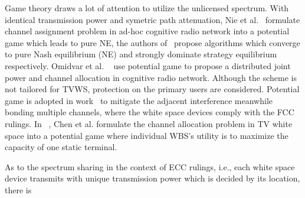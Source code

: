 \documentclass[times]{ettauth}
\newcommand{\ie}{i.e., }
\theoremstyle{mytheoremstyle}
\theoremstyle{mytheoremstyle}
\theoremstyle{mytheoremstyle}
\begin{document}
Game theory draws a lot of attention to utilize the unlicensed spectrum.
With identical transmission power and symetric path attenuation, Nie et al.~\cite{CApotentialLearning_05dyspan} formulate channel assignment problem in ad-hoc cognitive radio network into a potential game which leads to pure NE, the authors of~\cite{CA_Felegyhazi_07infocom, Wu_GOP_CA_08infocom} propose algorithms which converge to pure Nash equilibrium (NE) and strongly dominate strategy equilibrium respectively. 
Omidvar et al. ~\cite{pimrc_2012} use potential game to propose a distributed joint power and channel allocation in cognitive radio network.
Although the scheme is not tailored for TVWS, protection on the primary users are considered.
Potential game is adopted in work~\cite{Elias17} to mitigate the adjacent interference meanwhile bonding multiple channels, where the white space devices comply with the FCC rulings.
In ~\cite{spectrum_sharing_tvspace_2012}, Chen et al. formulate the channel allocation problem in TV white space into a potential game where individual WBS's utility is to maximize the capacity of one static terminal.

As to the spectrum sharing in the context of ECC rulings, \ie each white space device transmits with unique transmission power which is decided by its location, there is 

\end{document}
